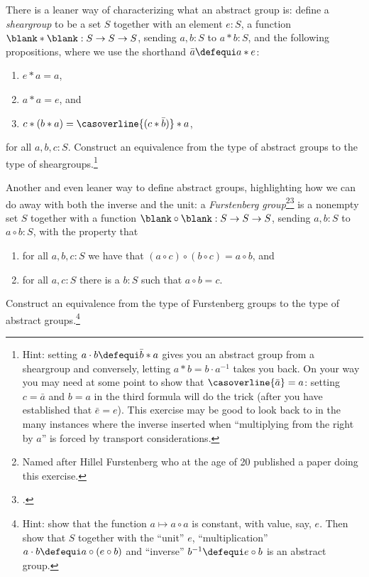 \begin{xca}
  \label{xca:cheapgroup}
  There is a leaner way of characterizing what an abstract group is:
  define a \emph{sheargroup} to be a set $S$ together with an element $e:S$,
  a function $\blank * \blank: S\to S\to S$, sending $a,b:S$ to $a*b:S$,
  and the following propositions,
  where we use the shorthand $\bar a\defequi a*e$:
  \begin{enumerate}
  \item $e*a=a$,
  \item $a*a=e$, and
  \item $c*(b*a)=\casoverline{(c*\bar b)}*a$,
  \end{enumerate}
  for all $a,b,c:S$.
  Construct an equivalence from the type of abstract groups to the type of sheargroups.\footnote{%
      Hint: setting $a\cdot b\defequi \bar b*a$ gives you an abstract group from a sheargroup and conversely, letting $a*b=b\cdot a^{-1}$ takes you back.  On your way you may need at some point to show that $\casoverline{\bar a}=a$: setting $c=\bar a$ and $b=a$ in the third formula will do the trick (after you have established that $\bar e=e$).  This exercise may be good to look back to in the many instances where the inverse inserted when ``multiplying from the right by $a$'' is forced by transport considerations.}
\end{xca}
\begin{xca}
  Another and even leaner way to define abstract groups, highlighting how we can do away with both the inverse and the unit: a \emph{Furstenberg group}\footnote{%
    Named after Hillel Furstenberg who at the age of 20 published a paper doing this exercise.\footnotemark{}}\footcitetext{Furstenberg}
  is a nonempty set $S$ together with a function
  $\blank\circ\blank : S \to S \to S$, sending $a,b:S$ to $a\circ b:S$,
  with the property that
  \begin{enumerate}
  \item for all $a,b,c:S$ we have that $(a\circ c)\circ(b\circ c)=a\circ b$, and
  \item for all $a,c:S$ there is a $b:S$ such that $a\circ b=c$.
  \end{enumerate}
  Construct an equivalence from the type of Furstenberg groups to the type of
  abstract groups.\footnote{%
    Hint: show that the function $a\mapsto a\circ a$ is constant, with value, say, $e$.  Then show that $S$ together with the ``unit'' $e$, ``multiplication'' $a\cdot b\defequi a\circ(e\circ b)$ and ``inverse'' $b^{-1}\defequi e\circ b$ is an abstract group.}
\end{xca}

